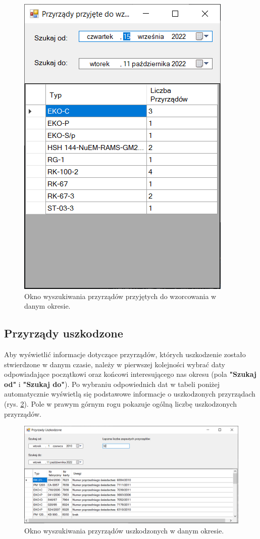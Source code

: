 \begin{figure}[htb]
	\centering
	\includegraphics{obrazki/Wyszukiwanie/przyrzady_przyjete.png}
	\caption{Okno wyszukiwania przyrządów przyjętych do wzorcowania w danym okresie.}
	\label{przyrzadyPrzyjete}
\end{figure}

\subsection{Przyrządy uszkodzone}
\label{uszkodzone}

Aby wyświetlić informacje dotyczące przyrządów, których uszkodzenie zostało stwierdzone w danym czasie, należy w pierwszej kolejności wybrać daty odpowiadające początkowi oraz końcowi interesującego nas okresu (pola \textbf{"Szukaj od"} i \textbf{"Szukaj do"}). Po wybraniu odpowiednich dat w tabeli poniżej automatycznie wyświetlą się podstawowe informacje o uszkodzonych przyrządach (rys. \ref{przyrzadyUszkodzone}).  Pole w prawym górnym rogu pokazuje ogólną liczbę uszkodzonych przyrządów.

\begin{figure}[htb]
	\centering
	\includegraphics[width=\columnwidth]{obrazki/Wyszukiwanie/przyrzady_uszkodzone.png}
	\caption{Okno wyszukiwania przyrządów uszkodzonych w danym okresie.}
	\label{przyrzadyUszkodzone}
\end{figure}